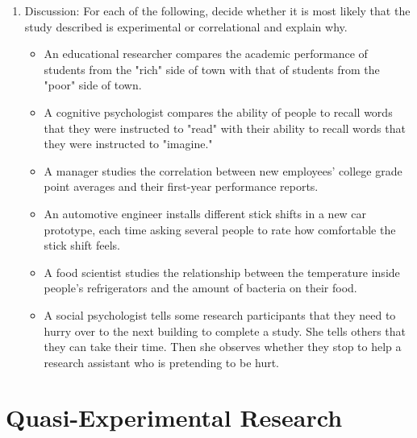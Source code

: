 \begin{fullwidth}

\begin{enumerate}

\item  Discussion: For each of the following, decide whether it is most likely that the study described is experimental or correlational and explain why.

\begin{itemize}

\item  An educational researcher compares the academic performance of students from the "rich" side of town with that of students from the "poor" side of town.

\item A cognitive psychologist compares the ability of people to recall words that they were instructed to "read" with their ability to recall words that they were instructed to "imagine."

\item A manager studies the correlation between new employees' college grade point averages and their first-year performance reports.

\item An automotive engineer installs different stick shifts in a new car prototype, each time asking several people to rate how comfortable the stick shift feels.

\item A food scientist studies the relationship between the temperature inside people's refrigerators and the amount of bacteria on their food.

\item A social psychologist tells some research participants that they need to hurry over to the next building to complete a study. She tells others that they can take their time. Then she observes whether they stop to help a research assistant who is pretending to be hurt.


\end{itemize}

\end{enumerate}

\end{fullwidth}


\newpage
\section{Quasi-Experimental Research}

